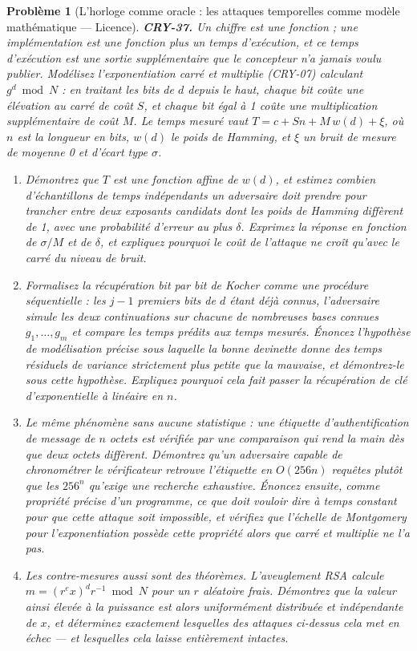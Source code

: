 \documentclass[11pt]{article}
\newtheorem{problem}{Problème}
\begin{document}
\begin{problem}[{L'horloge comme oracle : les attaques temporelles comme modèle mathématique --- Licence}]
\textbf{CRY-37.} Un chiffre est une fonction ; une \textit{implémentation} est une fonction
plus un temps d'exécution, et ce temps d'exécution est une sortie supplémentaire que le
concepteur n'a jamais voulu publier. Modélisez l'exponentiation \og{} carré et multiplie \fg{}
(CRY-07) calculant $g^{d} \bmod N$ : en traitant les bits de $d$ depuis le haut, chaque
bit coûte une élévation au carré de coût $S$, et chaque bit égal à 1 coûte une
multiplication supplémentaire de coût $M$. Le temps mesuré vaut
$T = c + Sn + M\,w(d) + \xi$, où $n$ est la longueur en bits, $w(d)$ le poids de
Hamming, et $\xi$ un bruit de mesure de moyenne 0 et d'écart type
$\sigma$.
\begin{enumerate}
\item[(a)] Démontrez que $T$ est une fonction affine de $w(d)$, et estimez combien
d'échantillons de temps indépendants un adversaire doit prendre pour trancher entre deux
exposants candidats dont les poids de Hamming diffèrent de 1, avec une probabilité d'erreur
au plus $\delta$. Exprimez la réponse en fonction de $\sigma/M$ et de $\delta$, et
expliquez pourquoi le coût de l'attaque ne croît qu'avec le \textit{carré} du niveau de
bruit.
\item[(b)] Formalisez la récupération bit par bit de Kocher comme une procédure séquentielle : les
$j-1$ premiers bits de $d$ étant déjà connus, l'adversaire simule les deux
continuations sur chacune de nombreuses bases connues $g_1,\dots,g_m$ et compare les temps
prédits aux temps mesurés. Énoncez l'hypothèse de modélisation précise sous laquelle la
bonne devinette donne des temps résiduels de variance strictement plus petite que la
mauvaise, et démontrez-le sous cette hypothèse. Expliquez pourquoi cela fait passer la
récupération de clé d'exponentielle à linéaire en $n$.
\item[(c)] Le même phénomène sans aucune statistique : une étiquette d'authentification de message
de $n$ octets est vérifiée par une comparaison qui rend la main dès que deux octets
diffèrent. Démontrez qu'un adversaire capable de chronométrer le vérificateur retrouve
l'étiquette en $O(256n)$ requêtes plutôt que les $256^{n}$ qu'exige une recherche
exhaustive. Énoncez ensuite, comme propriété précise d'un programme, ce que doit vouloir dire
\og{} à temps constant \fg{} pour que cette attaque soit impossible, et vérifiez que l'échelle de
Montgomery pour l'exponentiation possède cette propriété alors que \og{} carré et multiplie \fg{} ne
l'a pas.
\item[(d)] Les contre-mesures aussi sont des théorèmes. L'aveuglement RSA calcule $m = (r^{e}x)^{d}
r^{-1} \bmod N$ pour un $r$ aléatoire frais. Démontrez que la valeur ainsi élevée à la
puissance est alors uniformément distribuée et indépendante de $x$, et déterminez
exactement lesquelles des attaques ci-dessus cela met en échec --- et lesquelles cela laisse
entièrement intactes.
\end{enumerate}

\end{problem}
\end{document}
